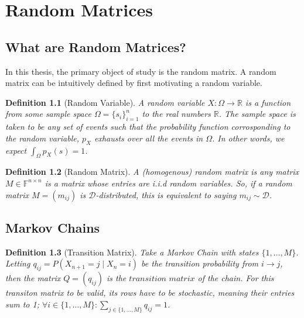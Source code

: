 
\usepackage[utf8]{inputenc}
\usepackage[english]{babel}
\usepackage{dsfont}
\usepackage{amsthm}
\newcommand{\F}{\mathbb{F}}
\newcommand{\onetoM}{\{1,\dots,M\}}
\newcommand{\R}{\mathbb{R}}

\newtheorem{definition}{Definition}[section]
\setlength{\parskip}{0pt}
\setlength\parindent{24pt}

\newtheorem*{algorithm}{Algorithm}
\setlength{\parskip}{0pt}
\setlength\parindent{24pt}



\chapter{Random Matrices}
\section{What are Random Matrices?}
In this thesis, the primary object of study is the random matrix. A random matrix can be intuitively defined by first motivating a random variable. 

\begin{definition}[Random Variable]
A random variable $X: \Omega \to \mathbb{R}$ is a function from some sample space $\Omega = \{s_i\}_{i=1}^n$ to the real numbers $\mathbb{R}$. The sample space is taken to be any set of events such that the probability function corrosponding to the random variable, $p_X$ exhausts over all the events in $\Omega$. In other words, we expect $\int_\Omega p_X(s) = 1$.
\end{definition}

\begin{definition}[Random Matrix]
A (homogenous) random matrix is any matrix $M \in \F^{n \times n}$ is a matrix whose entries are i.i.d random variables. So, if a random matrix $M = (m_{ij})$ is $\mathcal{D}$-distributed, this is equivalent to saying $m_{ij} \sim \mathcal{D}$.
\end{definition}

\section{Markov Chains}

\begin{definition}[Transition Matrix] 
Take a Markov Chain with states $\onetoM$. Letting $q_{ij} = P(X_{n+1} = j \mid X_n = i)$ be the transition probability from $i \to j$, then the matrix $Q=(q_{ij})$ is the $\textit{transition matrix}$ of the chain. For this transiton matrix to be valid, its rows have to be stochastic, meaning their entries sum to 1; $\forall i \in \onetoM: \sum_{j \in \onetoM} q_{ij} = 1$.
\end{definition}

